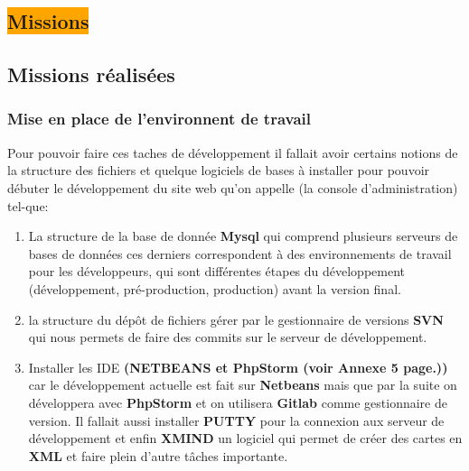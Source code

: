 \begin{center}
\section{\colorbox{orange}{Missions}}
\end{center}


\subsection{Missions réalisées}
\subsubsection{Mise en place de l'environnent de travail}
Pour pouvoir faire ces taches de développement il fallait avoir certains notions de la structure des fichiers et quelque logiciels de bases à installer pour pouvoir débuter le développement du site web qu'on appelle (la console d'administration) tel-que: 
\begin{enumerate}
\item La structure de la base de donnée \textbf{Mysql} qui comprend plusieurs serveurs de bases de données ces derniers correspondent à des environnements de travail pour les développeurs, qui sont différentes étapes du développement (développement, pré-production, production) avant la version final.
\item la structure du dépôt de fichiers gérer par le gestionnaire de versions \textbf{SVN} qui nous permets de faire des commits sur le serveur de développement.
\item Installer les IDE \textbf{(NETBEANS et PhpStorm (voir Annexe 5 page.\pageref{ide}))} car le développement actuelle est fait sur \textbf{Netbeans} mais que par la suite on développera avec \textbf{PhpStorm} et on utilisera \textbf{Gitlab} comme gestionnaire de version. Il fallait aussi installer \textbf{PUTTY} pour la connexion aux serveur de développement et enfin \textbf{XMIND} un logiciel qui permet de créer des cartes en \textbf{XML} et faire plein d'autre tâches importante. 
\end{enumerate}
  

